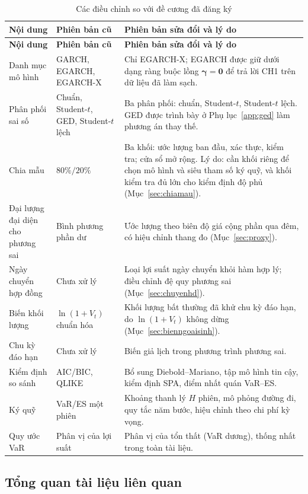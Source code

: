 \documentclass[12pt,a4paper]{article}
\theoremstyle{definition}
\theoremstyle{remark}
\newcommand{\bgamma}{\boldsymbol{\gamma}}
\begin{document}
\begin{longtable}{@{}p{4.2cm}p{4.6cm}p{6cm}@{}}
\caption{Các điều chỉnh so với đề cương đã đăng ký}\label{tab:thaydoi}\\
\toprule
\textbf{Nội dung} & \textbf{Phiên bản cũ} & \textbf{Phiên bản sửa đổi và lý do} \\
\midrule
\endfirsthead
\toprule
\textbf{Nội dung} & \textbf{Phiên bản cũ} & \textbf{Phiên bản sửa đổi và lý do} \\
\midrule
\endhead
Danh mục mô hình & GARCH, EGARCH, EGARCH-X & Chỉ EGARCH-X; EGARCH được giữ dưới dạng ràng buộc lồng $\bgamma=\mathbf 0$ để trả lời CH1 trên dữ liệu đã làm sạch. \\
Phân phối sai số & Chuẩn, Student-$t$, GED, Student-$t$ lệch & Ba phân phối: chuẩn, Student-$t$, Student-$t$ lệch. GED được trình bày ở Phụ lục~\ref{app:ged} làm phương án thay thế. \\
Chia mẫu & $80\%/20\%$ & Ba khối: ước lượng ban đầu, xác thực, kiểm tra; cửa sổ mở rộng. Lý do: cần khối riêng để chọn mô hình và siêu tham số ký quỹ, và khối kiểm tra đủ lớn cho kiểm định độ phủ (Mục~\ref{sec:chiamau}). \\
Đại lượng đại diện cho phương sai & Bình phương phần dư & Ước lượng theo biên độ giá cộng phần qua đêm, có hiệu chỉnh thang đo (Mục~\ref{sec:proxy}). \\
Ngày chuyển hợp đồng & Chưa xử lý & Loại lợi suất ngày chuyển khỏi hàm hợp lý; điều chỉnh đệ quy phương sai (Mục~\ref{sec:chuyenhd}). \\
Biến khối lượng & $\ln(1+V_t)$ chuẩn hóa & Khối lượng bất thường đã khử chu kỳ đáo hạn, do $\ln(1+V_t)$ không dừng (Mục~\ref{sec:bienngoaisinh}). \\
Chu kỳ đáo hạn & Chưa xử lý & Biến giả lịch trong phương trình phương sai. \\
Kiểm định so sánh & AIC/BIC, QLIKE & Bổ sung Diebold--Mariano, tập mô hình tin cậy, kiểm định SPA, điểm nhất quán VaR--ES. \\
Ký quỹ & VaR/ES một phiên & Khoảng thanh lý $H$ phiên, mô phỏng đường đi, quy tắc năm bước, hiệu chỉnh theo chi phí kỳ vọng. \\
Quy ước VaR & Phân vị của lợi suất & Phân vị của tổn thất (VaR dương), thống nhất trong toàn tài liệu. \\
\bottomrule
\end{longtable}

\subsection{Tổng quan tài liệu liên quan}
\end{document}
